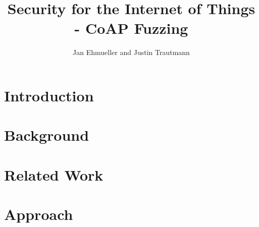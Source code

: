 \documentclass[sigconf]{acmart}
\begin{document}
\title{Security for the Internet of Things - CoAP Fuzzing}

\author{Jan Ehmueller and Justin Trautmann}

\begin{abstract}
\end{abstract}

\maketitle

\glsresetall

\section{Introduction}


\section{Background}


\section{Related Work}


\section{Approach}

\end{document}
